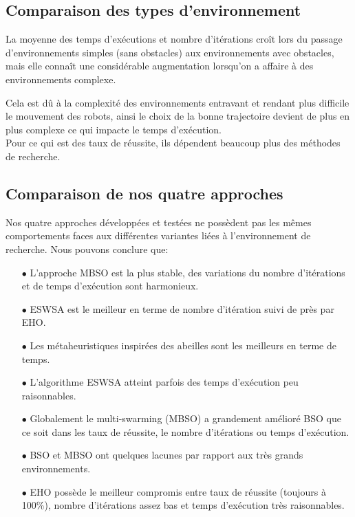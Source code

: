 

\subsection{Comparaison des types d'environnement}
La moyenne des temps d'exécutions et nombre d'itérations croît lors du passage d'environnements simples (sans obstacles) aux environnements avec obstacles, mais elle connaît une considérable  augmentation lorsqu'on a affaire à des environnements complexe.

Cela est dû à la complexité des environnements entravant et rendant plus difficile le mouvement des robots, ainsi le choix de la bonne trajectoire devient de plus en plus complexe ce qui impacte le temps d'exécution.\\
Pour ce qui est des taux de réussite, ils dépendent beaucoup plus des méthodes de recherche.

\subsection{Comparaison de nos quatre approches}
Nos quatre approches développées et testées ne possèdent pas les mêmes comportements faces aux différentes variantes liées à l'environnement de recherche. Nous pouvons conclure que:
\begin{itemize}
\item[$\bullet$] L'approche MBSO est la plus stable, des variations du nombre d'itérations et de temps d'exécution sont harmonieux.


\item[$\bullet$] ESWSA est le meilleur en terme de nombre d'itération suivi de près par EHO. 

\item[$\bullet$] Les métaheuristiques inspirées des abeilles sont les meilleurs en terme de temps.

\item[$\bullet$] L'algorithme ESWSA atteint parfois des temps d'exécution peu raisonnables.

\item[$\bullet$] Globalement le multi-swarming (MBSO) a grandement amélioré BSO que ce soit dans les taux de réussite, le nombre d'itérations ou temps d'exécution. 

\item[$\bullet$] BSO et MBSO ont quelques lacunes par rapport aux très grands environnements.

\item[$\bullet$] EHO possède le meilleur compromis entre taux de réussite (toujours à 100\%), nombre d'itérations assez bas et temps d'exécution très raisonnables.

\end{itemize}



